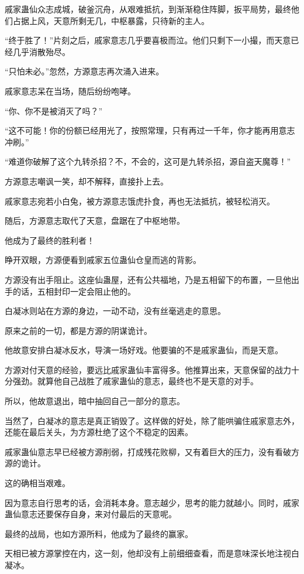 \begin{this_body}
戚家蛊仙众志成城，破釜沉舟，从艰难抵抗，到渐渐稳住阵脚，扳平局势，最终他们占据上风，天意所剩无几，中枢暴露，只待新的主人。

“终于胜了！”片刻之后，戚家意志几乎要喜极而泣。他们只剩下一小撮，而天意已经几乎消散殆尽。

“只怕未必。”忽然，方源意志再次涌入进来。

戚家意志呆在当场，随后纷纷咆哮。

“你、你不是被消灭了吗？”

“这不可能！你的份额已经用光了，按照常理，只有再过一千年，你才能再用意志冲刷。”

“难道你破解了这个九转杀招？不，不会的，这可是九转杀招，源自盗天魔尊！”

方源意志嘲讽一笑，却不解释，直接扑上去。

戚家意志宛若小白兔，被方源意志饿虎扑食，再也无法抵抗，被轻松消灭。

随后，方源意志取代了天意，盘踞在了中枢地带。

他成为了最终的胜利者！

睁开双眼，方源便看到戚家五位蛊仙仓皇而逃的背影。

方源没有出手阻止。这座仙蛊屋，还有公共福地，乃是五相留下的布置，一旦他出手的话，五相封印一定会阻止他的。

白凝冰则站在方源的身边，一动不动，没有丝毫逃走的意思。

原来之前的一切，都是方源的阴谋诡计。

他故意安排白凝冰反水，导演一场好戏。他要骗的不是戚家蛊仙，而是天意。

方源对付天意的经验，要远比戚家蛊仙丰富得多。他推算出来，天意保留的战力十分强劲。就算他自己战胜了戚家蛊仙的意志，最终也不是天意的对手。

所以，他故意退出，暗中抽回自己一部分的意志。

当然了，白凝冰的意志是真正销毁了。这样做的好处，除了能哄骗住戚家意志外，还能在最后关头，为方源杜绝了这个不稳定的因素。

戚家蛊仙意志早已经被方源削弱，打成残花败柳，又有着巨大的压力，没有看破方源的诡计。

这的确相当艰难。

因为意志自行思考的话，会消耗本身。意志越少，思考的能力就越小。同时，戚家蛊仙意志还要保存自身，来对付最后的天意呢。

最终的战局，也如方源所料，他成为了最终的赢家。

天相已被方源掌控在内，这一刻，他却没有上前细细查看，而是意味深长地注视白凝冰。


\end{this_body}
